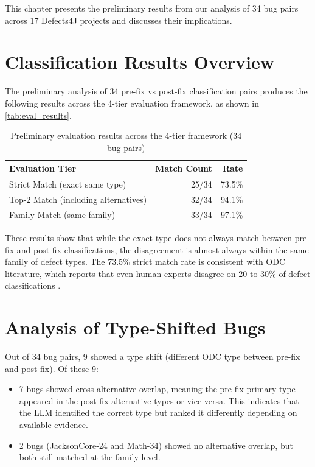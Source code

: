 \documentclass{iutbscthesis}
\begin{document}
This chapter presents the preliminary results from our analysis of 34 bug pairs across 17 Defects4J projects and discusses their implications.

\section{Classification Results Overview}

The preliminary analysis of 34 pre-fix vs post-fix classification pairs produces the following results across the 4-tier evaluation framework, as shown in \autoref{tab:eval_results}.

\begin{table}[H]
    \centering
    \begin{tabular}{l r r}
        \toprule
        \textbf{Evaluation Tier} & \textbf{Match Count} & \textbf{Rate} \\
        \midrule
        Strict Match (exact same type) & 25/34 & 73.5\% \\
        Top-2 Match (including alternatives) & 32/34 & 94.1\% \\
        Family Match (same family) & 33/34 & 97.1\% \\
        \bottomrule
    \end{tabular}
    \caption{Preliminary evaluation results across the 4-tier framework (34 bug pairs)}
    \label{tab:eval_results}
\end{table}

These results show that while the exact type does not always match between pre-fix and post-fix classifications, the disagreement is almost always within the same family of defect types. The 73.5\% strict match rate is consistent with ODC literature, which reports that even human experts disagree on 20 to 30\% of defect classifications \cite{chillarege1992odc}.

\section{Analysis of Type-Shifted Bugs}

Out of 34 bug pairs, 9 showed a type shift (different ODC type between pre-fix and post-fix). Of these 9:
\begin{itemize}
    \item 7 bugs showed cross-alternative overlap, meaning the pre-fix primary type appeared in the post-fix alternative types or vice versa. This indicates that the LLM identified the correct type but ranked it differently depending on available evidence.
    \item 2 bugs (JacksonCore-24 and Math-34) showed no alternative overlap, but both still matched at the family level.
\end{itemize}
\end{document}
